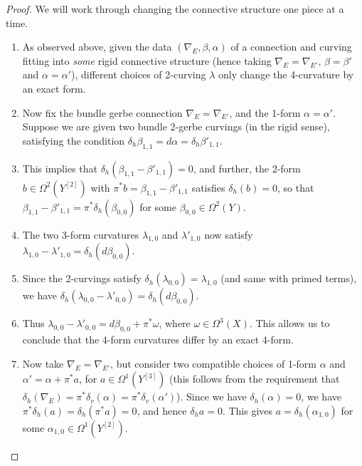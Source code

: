 \documentclass[12pt]{amsart}
\theoremstyle{plain}
\theoremstyle{definition}
\theoremstyle{remark}
\numberwithin{equation}{section}
\newcommand{\<}{\langle}
\renewcommand{\>}{\rangle}
\begin{document}
\begin{proof} 
We will work through changing the connective structure one piece at a time. 

\begin{enumerate}
\item As observed above, given the data $(\nabla_E,\beta,\alpha)$ of a connection and curving fitting into \emph{some} rigid connective structure (hence taking $\nabla_E=\nabla_{E'}$, $\beta=\beta'$ and $\alpha=\alpha'$), different choices of 2-curving $\lambda$ only change the 4-curvature by an exact form.

\item Now fix the bundle gerbe connection $\nabla_E=\nabla_{E'}$, and the 1-form $\alpha=\alpha'$.
Suppose we are given two bundle 2-gerbe curvings (in the rigid sense), satisfying the condition $\delta_h\beta_{1,1}= d\alpha=\delta_h\beta'_{1,1}$.

\item This implies that $\delta_h(\beta_{1,1}-\beta'_{1,1}) = 0$, and further, the 2-form $b\in \Omega^2(Y^{[2]})$ with $\pi^*b = \beta_{1,1}-\beta'_{1,1}$ satisfies $\delta_h(b)=0$, so that $\beta_{1,1}-\beta'_{1,1} = \pi^*\delta_h(\beta_{0,0})$ for some $\beta_{0,0}\in \Omega^2(Y)$.

\item The two 3-form curvatures $\lambda_{1,0}$ and $\lambda'_{1,0}$ now satisfy $\lambda_{1,0} - \lambda'_{1,0} = \delta_h(d\beta_{0,0})$.

\item Since the 2-curvings satisfy $\delta_h(\lambda_{0,0})=\lambda_{1,0}$ (and same with primed terms), we have $\delta_h(\lambda_{0,0} - \lambda'_{0,0}) = \delta_h(d\beta_{0,0})$.

\item Thus $\lambda_{0,0} - \lambda'_{0,0} = d\beta_{0,0} + \pi^*\omega$, where $\omega\in \Omega^3(X)$. 
This allows us to conclude that the 4-form curvatures differ by an exact 4-form.

\item Now take $\nabla_E = \nabla_{E'}$, but consider two compatible choices of 1-form $\alpha$ and $\alpha' = \alpha+\pi^*a$, for $a\in \Omega^1(Y^{[3]})$ (this follows from the requirement that $\delta_h(\nabla_E) = \pi^*\delta_v(\alpha)=\pi^*\delta_v(\alpha')$).
Since we have $\delta_h(\alpha) = 0$, we have $\pi^*\delta_h (a) =\delta_h(\pi^*a) = 0$, and hence $\delta_h a=0$.
This gives $a=\delta_h(\alpha_{1,0})$ for some $\alpha_{1,0}\in \Omega^1(Y^{[2]})$.


\end{enumerate}
\end{proof}
\end{document}
